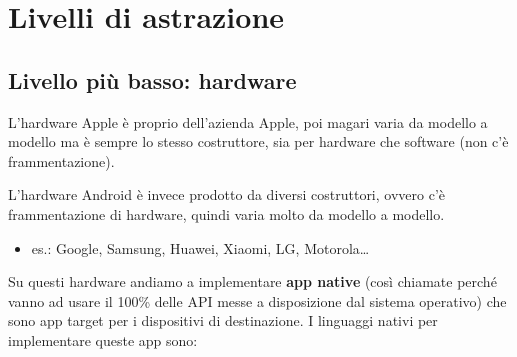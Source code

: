 \section{Livelli di astrazione}
\subsection{Livello più basso: hardware}
\par L'hardware Apple è proprio dell'azienda Apple, poi magari varia da modello a modello ma è sempre lo stesso costruttore, sia per hardware che software (non c'è frammentazione).
\par L'hardware Android è invece prodotto da diversi costruttori, ovvero c'è frammentazione di hardware, quindi varia molto da modello a modello.
\begin{itemize}
    \item es.: Google, Samsung, Huawei, Xiaomi, LG, Motorola\dots
\end{itemize}
\par Su questi hardware andiamo a implementare \textbf{app native} (così chiamate perché vanno ad usare il 100\% delle API messe a disposizione dal sistema operativo) che sono app target per i dispositivi di destinazione. I linguaggi nativi per implementare queste app sono:
